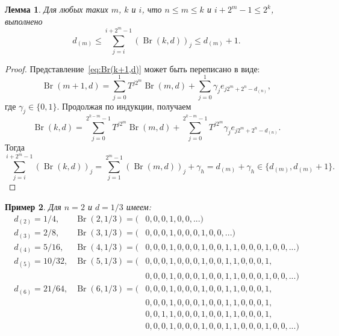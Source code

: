\documentclass[a4paper,14pt]{article} %
\theoremstyle{plain}
\newtheorem{lemma}{Лемма}[section]
\newtheorem{example}[lemma]{Пример}
\begin{document}
\begin{lemma}
	\label{lem:sum_Br_k_c}
	Для любых таких $m$, $k$ и $i$, что $n \leq m \leq k$ и  $ i + 2^m - 1 \leq 2^k$,
	выполнено
	\begin{equation}
		d_{(m)} \leq \sum_{j=i}^{i+2^m-1} (\operatorname{Br}(k,d))_j \leq d_{(m)}+1
		.
	\end{equation}
\end{lemma}
\begin{proof}
	Представление~\eqref{eq:Br(k+1,d)} может быть переписано в виде:
	\begin{equation}
		\operatorname{Br}(m+1,d) = \sum_{j=0}^{1} T^{j2^m} \operatorname{Br}(m,d) + \sum_{j=0}^{1} \gamma_{j} e_{j 2^m+2^n-d_{(n)}}
		,
	\end{equation}
	где $\gamma_{j} \in \{0,1\}$.
	Продолжая по индукции, получаем
	\begin{equation}
		\operatorname{Br}(k,d) = \sum_{j=0}^{2^{k-m}-1} T^{j2^m} \operatorname{Br}(m,d) +
		\sum_{j=0}^{2^{k-m}-1} T^{j2^m} \gamma_{j} e_{j2^m+2^n-d_{(n)}}
		.
	\end{equation}
	Тогда
	\begin{equation}
		\sum_{j=i}^{i+2^m-1} (\operatorname{Br}(k,d))_j
		=
		\sum_{j=1}^{2^m-1} (\operatorname{Br}(m,d))_j
		+ \gamma_h
		=
		d_{(m)} + \gamma_h
		\in \{d_{(m)}, d_{(m)}+1\}
		.
	\end{equation}
\end{proof}

\begin{example}
	Для $n=2$ и $d=1/3$ имеем:
	\begin{equation*}
		\begin{array}{lll}
			d_{(2)} = 1/4, &
			\operatorname{Br}(2,1/3) = (&0,0,0,1,0,0,...)
			\\
			d_{(3)} = 2/8, &
			\operatorname{Br}(3,1/3) = (&0,0,0,1,0,0,0,1,0,0,...)
			\\
			d_{(4)} = 5/16, &
			\operatorname{Br}(4,1/3) = (&0,0,0,1, 0,0,0,1,   0,0,1,1, 0,0,0,1,  0,0,...)
			\\
			d_{(5)} = 10/32, &
			\operatorname{Br}(5,1/3) = (&
			                             0,0,0,1, 0,0,0,1,   0,0,1,1, 0,0,0,1,\\&
			                           & 0,0,0,1, 0,0,0,1,   0,0,1,1, 0,0,0,1,
			0,0,...)
			\\
			d_{(6)} = 21/64, &
			\operatorname{Br}(6,1/3) = (&
			                             0,0,0,1, 0,0,0,1,   0,0,1,1, 0,0,0,1,\\&
			                           & 0,0,0,1, 0,0,0,1,   0,0,1,1, 0,0,0,1,\\&
			                           & 0,0,1,1, 0,0,0,1,   0,0,1,1, 0,0,0,1,\\&
			                           & 0,0,0,1, 0,0,0,1,   0,0,1,1, 0,0,0,1,
			0,0,...)
		\end{array}
	\end{equation*}
\end{example}
\end{document}

